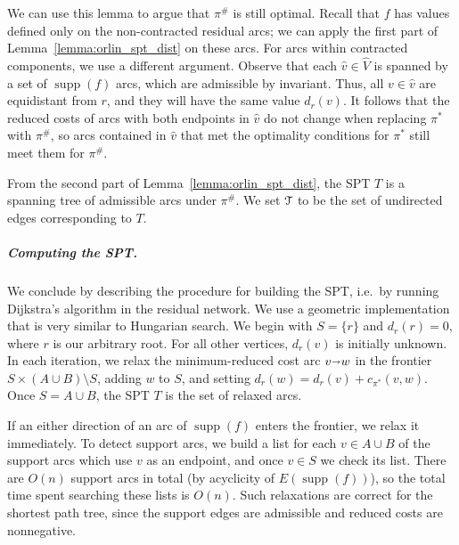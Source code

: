 \documentclass[a4paper,UKenglish]{socg-lipics-v2018}
\def\arcto{\mathord\shortrightarrow}
\def\arc#1#2{#1\arcto#2}
\def\supp{\operatorname{supp}}
\theoremstyle{plain}
\numberwithin{figure}{section}
\renewcommand{\paragraph}{\subparagraph}
\begin{document}
\begin{toappendix}
We can use this lemma to argue that $\pi^\#$ is still optimal.
Recall that $f$ has values defined only on the non-contracted residual arcs;
we can apply the first part of Lemma~\ref{lemma:orlin_spt_dist} on these arcs.
For arcs within contracted components, we use a different argument.
Observe that each $\hat{v} \in \hat{V}$ is spanned by a set of $\supp(f)$ arcs,
which are admissible by invariant.
Thus, all $v \in \hat{v}$ are equidistant from $r$, and they will have the same
value $d_r(v)$.
It follows that the reduced costs of arcs with both endpoints in $\hat{v}$
do not change when replacing $\pi^*$ with $\pi^\#$, so arcs contained in
$\hat{v}$ that met the optimality conditions for $\pi^*$ still meet them for
$\pi^\#$.

From the second part of Lemma~\ref{lemma:orlin_spt_dist}, the SPT $T$ is a
spanning tree of admissible arcs under $\pi^\#$.
We set $\EuScript{T}$ to be the set of undirected edges corresponding to $T$.

\paragraph{Computing the SPT.}
We conclude by describing the procedure for building the SPT, i.e.\ by
running Dijkstra's algorithm in the residual network.
We use a geometric implementation that is very similar to Hungarian search.
We begin with $S = \{r\}$ and $d_r(r) = 0$, where $r$ is our arbitrary root.
For all other vertices, $d_r(v)$ is initially unknown.
In each iteration, we relax the minimum-reduced cost arc $\arc vw$ in the
frontier $S \times (A \cup B) \setminus S$, adding $w$ to $S$, and setting
$d_r(w) = d_r(v) + c_{\pi^*}(v, w)$.
Once $S = A \cup B$, the SPT $T$ is the set of relaxed arcs.

If an either direction of an arc of $\supp(f)$ enters the frontier, we relax it
immediately.
To detect support arcs, we build a list for each $v \in A \cup B$ of the
support arcs which use $v$ as an endpoint, and once $v \in S$ we check its list.
There are $O(n)$ support arcs in total (by acyclicity of $E(\supp(f))$), so
the total time spent searching these lists is $O(n)$.
Such relaxations are correct for the shortest path tree, since the support
edges are admissible and reduced costs are nonnegative.


\end{toappendix}
\end{document}
